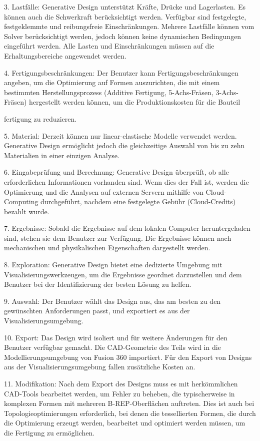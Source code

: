 3. Lastfälle: Generative Design unterstützt Kräfte, Drücke und Lagerlasten. Es können auch die Schwerkraft berücksichtigt werden. Verfügbar sind festgelegte, festgeklemmte und reibungsfreie Einschränkungen. Mehrere Lastfälle können vom Solver berücksichtigt werden, jedoch können keine dynamischen Bedingungen eingeführt werden. Alle Lasten und Einschränkungen müssen auf die Erhaltungsbereiche angewendet werden.

4. Fertigungsbeschränkungen: Der Benutzer kann Fertigungsbeschränkungen angeben, um die Optimierung auf Formen auszurichten, die mit einem bestimmten Herstellungsprozess (Additive Fertigung, 5-Achs-Fräsen, 3-Achs-Fräsen) hergestellt werden können, um die Produktionskosten für die Bauteil

fertigung zu reduzieren.

5. Material: Derzeit können nur linear-elastische Modelle verwendet werden. Generative Design ermöglicht jedoch die gleichzeitige Auswahl von bis zu zehn Materialien in einer einzigen Analyse.

6. Eingabeprüfung und Berechnung: Generative Design überprüft, ob alle erforderlichen Informationen vorhanden sind. Wenn dies der Fall ist, werden die Optimierung und die Analysen auf externen Servern mithilfe von Cloud-Computing durchgeführt, nachdem eine festgelegte Gebühr (Cloud-Credits) bezahlt wurde.

7. Ergebnisse: Sobald die Ergebnisse auf dem lokalen Computer heruntergeladen sind, stehen sie dem Benutzer zur Verfügung. Die Ergebnisse können nach mechanischen und physikalischen Eigenschaften dargestellt werden.

8. Exploration: Generative Design bietet eine dedizierte Umgebung mit Visualisierungswerkzeugen, um die Ergebnisse geordnet darzustellen und dem Benutzer bei der Identifizierung der besten Lösung zu helfen.

9. Auswahl: Der Benutzer wählt das Design aus, das am besten zu den gewünschten Anforderungen passt, und exportiert es aus der Visualisierungsumgebung.

10. Export: Das Design wird isoliert und für weitere Änderungen für den Benutzer verfügbar gemacht. Die CAD-Geometrie des Teils wird in die Modellierungsumgebung von Fusion 360 importiert. Für den Export von Designs aus der Visualisierungsumgebung fallen zusätzliche Kosten an.

11. Modifikation: Nach dem Export des Designs muss es mit herkömmlichen CAD-Tools bearbeitet werden, um Fehler zu beheben, die typischerweise in komplexen Formen mit mehreren B-REP-Oberflächen auftreten. Dies ist auch bei Topologieoptimierungen erforderlich, bei denen die tessellierten Formen, die durch die Optimierung erzeugt werden, bearbeitet und optimiert werden müssen, um die Fertigung zu ermöglichen.

